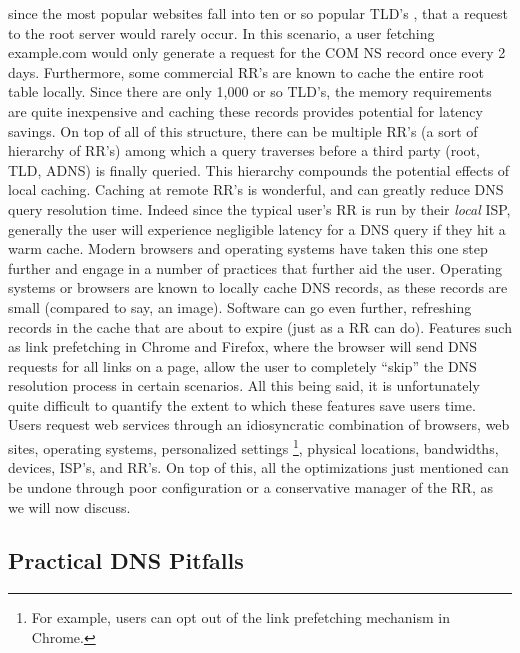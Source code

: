 \documentclass[sigconf,nonacm,10pt]{acmart}
\begin{document}
since the most popular websites fall into ten or so popular TLD's
\cite{alexa_topsites}, that a request to the root server would rarely
occur. In this scenario, a user fetching example.com would only generate
a request for the COM NS record once every 2 days. Furthermore, some
commercial RR's are known to cache the entire root table locally. Since
there are only 1,000 or so TLD's, the memory requirements are quite
inexpensive and caching these records provides potential for latency
savings. On top of all of this structure, there can be multiple RR's (a
sort of hierarchy of RR's) among which a query traverses before a third
party (root, TLD, ADNS) is finally queried. This hierarchy compounds the
potential effects of local caching. \break \break
Caching at remote RR's is wonderful, and can greatly reduce DNS query
resolution time. Indeed since the typical user's RR is run by their
\textit{local} ISP, generally the user will experience negligible
latency for a DNS query if they hit a warm cache. Modern browsers and
operating systems have taken this one step further and engage in a
number of practices that further aid the user. Operating systems or
browsers are known to locally cache DNS records, as these records are
small (compared to say, an image). Software can go even further,
refreshing records in the cache that are about to expire (just as a RR
can do). Features such as link prefetching in Chrome and Firefox, where
the browser will send DNS requests for all links on a page, allow the
user to completely ``skip'' the DNS resolution process in certain
scenarios. All this being said, it is unfortunately quite difficult to
quantify the extent to which these features save users time. Users
request web services through an idiosyncratic combination of browsers,
web sites, operating systems, personalized settings
\footnote{ For example, users can opt out of the link prefetching mechanism in Chrome. },
physical locations, bandwidths, devices, ISP's, and RR's. On top of
this, all the optimizations just mentioned can be undone through poor
configuration or a conservative manager of the RR, as we will now
discuss.

\subsection{Practical DNS Pitfalls}\label{practical-dns-pitfalls-1}
\end{document}
